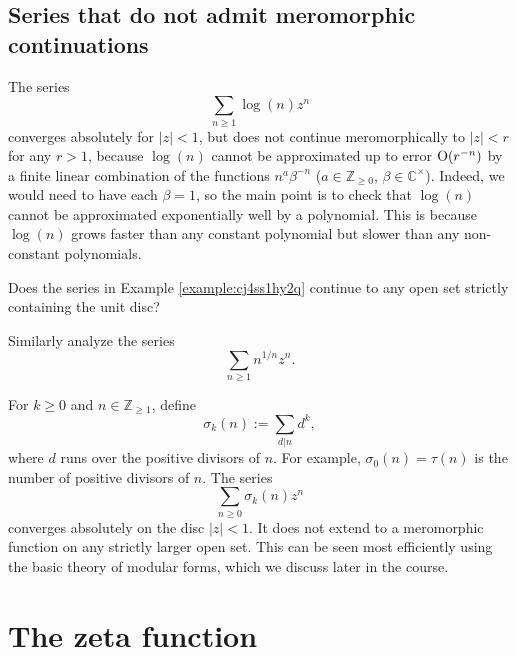 \documentclass[reqno]{amsart}  \numberwithin{theorem}{section} \numberwithin{equation}{section}
\begin{document}
\subsection{Series that do not admit meromorphic continuations}
\begin{example}\label{example:cj4ss1hy2q}
  The series
  \begin{equation*}
    \sum_{n \geq 1} \log(n) z^n
  \end{equation*}
  converges absolutely for $\lvert z \rvert < 1$, but does not continue meromorphically to $|z| < r$ for any $r > 1$, because $\log(n)$ cannot be approximated up to error $\operatorname{O}(r^{-n})$ by a finite linear combination of the functions $n^a \beta^{-n}$ ($a \in \mathbb{Z}_{\geq 0}$, $\beta \in \mathbb{C}^\times$).  Indeed, we would need to have each $\beta = 1$, so the main point is to check that $\log(n)$ cannot be approximated exponentially well by a polynomial.  This is because $\log(n)$ grows faster than any constant polynomial but slower than any non-constant polynomials.
\end{example}
\begin{question}
  Does the series in Example \ref{example:cj4ss1hy2q} continue to any open set strictly containing the unit disc?
\end{question}
\begin{exercise}
  Similarly analyze the series
  \begin{equation*}
    \sum_{n \geq 1} n^{1 / n} z^n.
  \end{equation*}
\end{exercise}
\begin{example}
  For $k \geq 0$ and $n \in \mathbb{Z}_{\geq 1}$, define
  \begin{equation*}
    \sigma_k(n) := \sum_{d | n} d^k,
  \end{equation*}
  where $d$ runs over the positive divisors of $n$.  For example, $\sigma_0(n) = \tau(n)$ is the number of positive divisors of $n$.  The series
  \begin{equation*}
    \sum_{n \geq 0} \sigma_k (n) z^n
  \end{equation*}
  converges absolutely on the disc $\lvert z \rvert < 1$.  It does not extend to a meromorphic function on any strictly larger open set.  This can be seen most efficiently using the basic theory of modular forms, which we discuss later in the course.
\end{example}

\newpage
\section{The zeta function}
\end{document}
